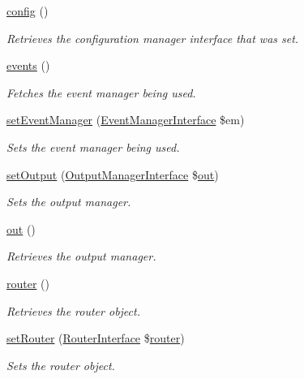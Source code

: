 \begin{DoxyCompactItemize}
\hyperlink{interfaceConfigurationDependency_a66f2b69553fee58df04e4a439ed539f1}{config} ()
\begin{DoxyCompactList}\small\item\em Retrieves the configuration manager interface that was set. \end{DoxyCompactList}\item 
\hyperlink{interfaceEventDependency_a6abcab4d92919174fcf029612f76814c}{events} ()
\begin{DoxyCompactList}\small\item\em Fetches the event manager being used. \end{DoxyCompactList}\item 
\hyperlink{interfaceEventDependency_a234314a10fbba9b70639c5a6c5d89148}{set\-Event\-Manager} (\hyperlink{interfaceEventManagerInterface}{Event\-Manager\-Interface} \$em)
\begin{DoxyCompactList}\small\item\em Sets the event manager being used. \end{DoxyCompactList}\item 
\hyperlink{interfaceOutputDependency_af915894ca0a2985f759834517861ce9d}{set\-Output} (\hyperlink{interfaceOutputManagerInterface}{Output\-Manager\-Interface} \$\hyperlink{interfaceOutputDependency_aaae940f994ba7252d2ae5163b5fa97eb}{out})
\begin{DoxyCompactList}\small\item\em Sets the output manager. \end{DoxyCompactList}\item 
\hyperlink{interfaceOutputDependency_aaae940f994ba7252d2ae5163b5fa97eb}{out} ()
\begin{DoxyCompactList}\small\item\em Retrieves the output manager. \end{DoxyCompactList}\item 
\hyperlink{interfaceRouterDependency_a418be22b7a1bdd25f68c89a38e71379d}{router} ()
\begin{DoxyCompactList}\small\item\em Retrieves the router object. \end{DoxyCompactList}\item 
\hyperlink{interfaceRouterDependency_ae9be61b962cc6e7e9600a0cba1a52d09}{set\-Router} (\hyperlink{interfaceRouterInterface}{Router\-Interface} \$\hyperlink{interfaceRouterDependency_a418be22b7a1bdd25f68c89a38e71379d}{router})
\begin{DoxyCompactList}\small\item\em Sets the router object. \end{DoxyCompactList}\end{DoxyCompactItemize}


